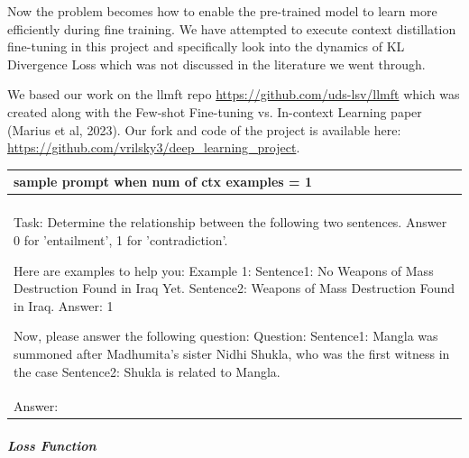 \documentclass[10pt,twocolumn,letterpaper]{article}
\newenvironment{itextbox}[1]
{\par\begin{center}
\begin{tabular}{|p{0.45\textwidth}|}
\hline
\textbf{#1} \\
\hline
\itshape\ignorespaces
}
{\\\hline
\end{tabular}
\end{center}\par}
\begin{document}
Now the problem becomes how to enable the pre-trained model to learn more efficiently during fine training. We have attempted to execute context distillation fine-tuning in this project and specifically look into the dynamics of KL Divergence Loss which was not discussed in the literature we went through. 

We based our work on the llmft repo \url{https://github.com/uds-lsv/llmft} which was created along with the Few-shot Fine-tuning vs. In-context Learning paper (Marius et al, 2023). Our fork and code of the project is available here: \url{https://github.com/vrilsky3/deep_learning_project}.

\begin{itextbox}{sample prompt when num of ctx examples = 1}
   \\
   Task: Determine the relationship between the following two sentences. Answer 0 for 'entailment', 1 for 'contradiction'.

   Here are examples  to help you:
   Example 1:
   Sentence1: No Weapons of Mass Destruction Found in Iraq Yet.
   Sentence2: Weapons of Mass Destruction Found in Iraq.
   Answer:  1
   
   Now, please answer the following question: 
   Question:
   Sentence1: Mangla was summoned after Madhumita's sister Nidhi Shukla, who was the first witness in the case      
   Sentence2: Shukla is related to Mangla.  \\        
   Answer:
\end{itextbox}

\subparagraph*{Loss Function}
\end{document}

